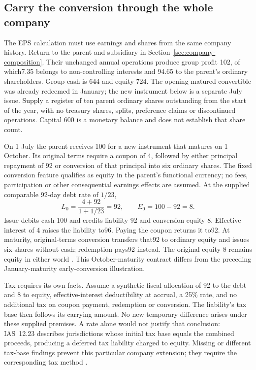 \subsection{Carry the conversion through the whole company}
\label{sec:company-eps-join}

The EPS calculation must use earnings and shares from the same company
history. Return to the parent and subsidiary in
Section~\ref{sec:company-composition}. Their unchanged annual operations
produce group profit 102, of which7.35 belongs to non-controlling interests
and 94.65 to the parent's ordinary shareholders. Group cash is 644 and equity
724. The opening matured convertible was already redeemed in January;
the new instrument below is a separate July issue. Supply a register of ten
parent ordinary shares outstanding from the start of the year, with no
treasury shares, splits, preference claims or discontinued operations.
Capital 600 is a monetary balance and does not establish that share count.

On 1 July the parent receives 100 for a new instrument that matures on
1 October. Its original terms require a coupon of 4, followed by either
principal repayment of 92 or conversion of that principal into six ordinary
shares. The fixed conversion feature qualifies as equity in the parent's
functional currency; no fees, participation or other consequential earnings
effects are assumed. At the supplied comparable 92-day debt rate of $1/23$,
\[
 L_0=\frac{4+92}{1+1/23}=92,\qquad E_0=100-92=8.
\]
Issue debits cash 100 and credits liability 92 and conversion equity 8.
Effective interest of 4 raises the liability to96. Paying the coupon returns
it to92. At maturity, original-terms conversion transfers that92 to ordinary
equity and issues six shares without cash; redemption pays92 instead.
The original equity 8 remains equity in either world
\citep[IAS~32, paragraphs 28--32 and AG32]{eu20231803}.
This October-maturity contract differs from the preceding January-maturity
early-conversion illustration.

Tax requires its own facts. Assume a synthetic fiscal allocation of 92 to
the debt and 8 to equity, effective-interest deductibility at accrual, a 25\%
rate, and no additional tax on coupon payment, redemption or conversion.
The liability's tax base then follows its carrying amount. No new temporary
difference arises under these supplied premises. A rate alone would not
justify that conclusion: IAS~12.23 describes jurisdictions whose initial tax
base equals the combined proceeds, producing a deferred tax liability charged
to equity. Missing or different tax-base findings prevent this particular
company extension; they require the corresponding tax method
\citep[IAS~12, paragraphs 8, 23, 58 and 61A]{eu20231803}.

